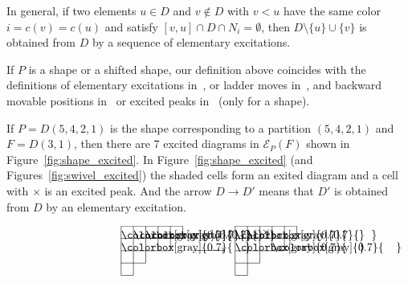 \documentclass[ALCO,ThmDefs,Unicode,epreuves]{cedram}
\newcommand\EE{\mathcal{E}}
\begin{document}
In general, if two elements $u \in D$ and $v \not\in D$ with $v < u$ 
have the same color $i = c(v) = c(u)$ and satisfy $[v,u] \cap D \cap N_i = \emptyset$, 
then $D \setminus \{ u \} \cup \{ v \}$ is obtained from $D$ by a sequence 
of elementary excitations.

If $P$ is a shape or a shifted shape, our definition above coincides with the definitions of 
elementary excitations in~\cite{IN1, IN2}, 
or ladder moves in~\cite{Kr1, Kr2}, 
and backward movable positions in~\cite{IN2, KN} 
or excited peaks in~\cite{MPP} (only for a shape).

\begin{exam}
\label{ex:shape_excited}
If $P = D(5,4,2,1)$ is the shape corresponding to a partition $(5,4,2,1)$ and 
$F = D(3,1)$, then there are $7$ excited diagrams in $\EE_P(F)$ shown in Figure~\ref{fig:shape_excited}.
In Figure~\ref{fig:shape_excited} (and Figures~\ref{fig:swivel_excited}) 
the shaded cells form an exited diagram and a cell with $\times$ is an excited peak.
And the arrow $D \longrightarrow D'$ means that $D'$ is obtained from $D$ by an elementary excitation.
\begin{figure}[t]
$$
\setlength{\unitlength}{1.1pt}
\begin{CD}
\raisebox{-20pt}{
\begin{picture}(50,40)
\fboxsep=0mm
\put(0,30){\colorbox[gray]{0.7}{\makebox(10,10){}}}
\put(10,30){\colorbox[gray]{0.7}{\makebox(10,10){}}}
\put(20,30){\colorbox[gray]{0.7}{\makebox(10,10){}}}
\put(0,20){\colorbox[gray]{0.7}{\makebox(10,10){}}}
\put(0,40){\line(1,0){50}}
\put(0,30){\line(1,0){50}}
\put(0,20){\line(1,0){40}}
\put(0,10){\line(1,0){20}}
\put(0,0){\line(1,0){10}}
\put(0,0){\line(0,1){40}}
\put(10,0){\line(0,1){40}}
\put(20,10){\line(0,1){30}}
\put(30,20){\line(0,1){20}}
\put(40,20){\line(0,1){20}}
\put(50,30){\line(0,1){10}}
\end{picture}
}
@>>>
\raisebox{-20pt}{
\begin{picture}(50,40)
\fboxsep=0mm
\put(0,30){\colorbox[gray]{0.7}{\makebox(10,10){}}}
\put(10,30){\colorbox[gray]{0.7}{\makebox(10,10){}}}
\put(30,20){\colorbox[gray]{0.7}{\makebox(10,10){}}}
\put(0,20){\colorbox[gray]{0.7}{\makebox(10,10){}}}
\put(0,40){\line(1,0){50}}
\put(0,30){\line(1,0){50}}
\put(0,20){\line(1,0){40}}
\put(0,10){\line(1,0){20}}
\put(0,0){\line(1,0){10}}
\put(0,0){\line(0,1){40}}
\put(10,0){\line(0,1){40}}
\put(20,10){\line(0,1){30}}
\put(30,20){\line(0,1){20}}
\put(40,20){\line(0,1){20}}
\put(50,30){\line(0,1){10}}
\put(20,30){\makebox(10,10){$\times$}}
\end{picture}
}
\end{CD}$$
\end{figure}
\end{exam}
\end{document}
